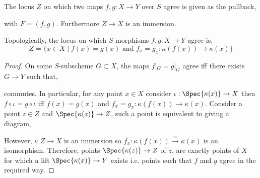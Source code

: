 \documentclass[12pt]{article}
\begin{document}
\begin{definition}
The locus $Z$ on which two maps $f, g : X \to Y$ over $S$ agree is given as the pullback,
\begin{center}
\end{center}
with $F = (f, g)$. Furthermore $Z \to X$ is an immersion. 
\end{definition}

\begin{lemma}
Topologically, the locus on which $S$-morphisms $f, g : X \to Y$ agree is,
\[ Z = \{ x \in X \mid f(x) = g(x) \text{ and } f_x = g_x : \kappa(f(x)) \to \kappa(x) \} \]
\end{lemma}

\begin{proof}
On some $S$-subscheme $G \subset X$, the maps $f|_G = g|_G$ agree iff there exists $G \to Y$ such that,
\begin{center}
\end{center}
commutes. In particular, for any point $x \in X$ consider $\iota : \Spec{\kappa(x)} \to X$ then $f \circ \iota = g \circ \iota$ iff $f(x) = g(x)$ and $f_x = g_x : \kappa(f(x)) \to \kappa(x)$. Consider a point $z \in Z$ and $\Spec{\kappa(z)} \to Z$, such a point is equivalent to giving a diagram,
\begin{center}
\end{center}
However, $\iota : Z \to X$ is an immersion so $f_x : \kappa(f(x)) \xrightarrow{\sim} \kappa(x)$ is an isomorphism. Therefore, points $\Spec{\kappa(z)} \to Z$ of $z$, are exactly points of $X$ for which a lift $\Spec{\kappa(x)} \to Y$ exists i.e. points such that $f$ and $g$ agree in the required way.
\end{proof}
\end{document}
